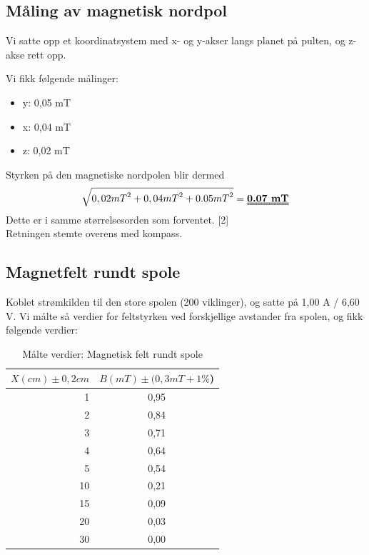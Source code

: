 \documentclass[12pt,norsk,a4paper]{article}
\begin{document}
\subsection{Måling av magnetisk nordpol}
Vi satte opp et koordinatsystem med x- og y-akser langs planet på pulten, og z-akse rett opp.

Vi fikk følgende målinger:
\begin{itemize}
\item{y: 0,05 mT}
\item{x: 0,04 mT}
\item{z: 0,02 mT}
\end{itemize}
Styrken på den magnetiske nordpolen blir dermed
\begin{equation}
    \label{eq:pythagoras}
    \sqrt{{0,02 mT}^2 + {0,04 mT}^2 + {0.05 mT}^2} = \textbf{\uuline{0.07 mT}}
\end{equation}
Dette er i samme størrelsesorden som forventet. {[2]} \\ 
Retningen stemte overens med kompass.
\clearpage

\subsection{Magnetfelt rundt spole}
Koblet strømkilden til den store spolen (200 viklinger), og satte på 1,00 A / 6,60 V.
Vi målte så verdier for feltstyrken ved forskjellige avstander fra spolen, og fikk følgende verdier:
\\
\begin{table}[H]
\begin{center}
	\begin{tabular}{ | r | c |}
	\hline
	$X(cm )\pm0,2cm$  &$B(mT)\pm(0,3mT+1\%$) \\ \hline
    1 & 0,95\\ \hline
    2 & 0,84\\ \hline
    3 & 0,71\\ \hline
    4 & 0,64\\ \hline
    5 & 0,54\\ \hline
    10 & 0,21\\ \hline
    15 & 0,09\\ \hline
    20 & 0,03\\ \hline
    30 & 0,00\\ \hline
    \hline
    \end{tabular}
    \end{center}
    \caption{Målte verdier: Magnetisk felt rundt spole}

\end{table}
\end{document}
